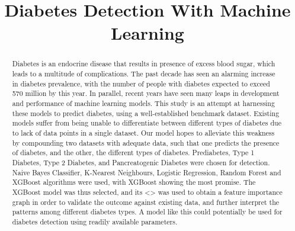 \documentclass{article}
\title{Diabetes Detection With Machine Learning}
\begin{document}
\fontsize{10}{12}\selectfont

\begin{abstract}
Diabetes is an endocrine disease that results in presence of excess blood sugar, which leads to a multitude of complications. The past decade has seen an alarming increase in diabetes prevalence, with the number of people with diabetes expected to exceed 570 million by this year. 
In parallel, recent years have seen many leaps in development and performance of machine learning models. This study is an attempt at harnessing these models to predict diabetes, using a well-established benchmark dataset.
Existing models suffer from being unable to differentiate between different types of diabetes due to lack of data points in a single dataset. Our model hopes to alleviate this weakness by compounding two datasets with adequate data, such that one predicts the presence of diabetes, and the other, the different types of diabetes. Prediabetes, Type 1 Diabetes, Type 2 Diabetes, and Pancreatogenic Diabetes were chosen for detection.
Naive Bayes Classifier, K-Nearest Neighbours, Logistic Regression, Random Forest and XGBoost algorithms were used, with XGBoost showing the most promise.
The XGBoost model was thus selected, and its <> was used to obtain a feature importance graph in order to validate the outcome against existing data, and further interpret the patterns among different diabetes types.
A model like this could potentially be used for diabetes detection using readily available parameters.
\end{abstract}
\end{document}

